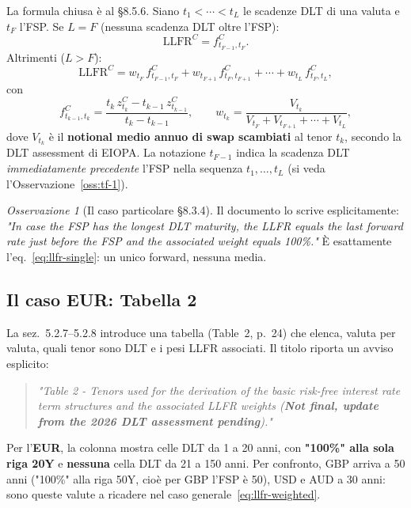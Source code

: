 \documentclass[11pt,a4paper]{article}
\theoremstyle{definition}
\theoremstyle{remark}
\newtheorem*{osservazione}{Osservazione}
\newcommand{\LLFR}{\mathrm{LLFR}}
\begin{document}
La formula chiusa \`e al §8.5.6. Siano $t_1<\cdots<t_L$ le scadenze DLT di una valuta e $t_F$
l'FSP. Se $L=F$ (nessuna scadenza DLT oltre l'FSP):
\begin{equation}
  \LLFR^C = f^C_{t_{F-1},t_F}.
  \label{eq:llfr-single}
\end{equation}
Altrimenti ($L>F$):
\begin{equation}
  \LLFR^C = w_{t_F}\,f^C_{t_{F-1},t_F} + w_{t_{F+1}}\,f^C_{t_F,t_{F+1}} + \cdots +
            w_{t_L}\,f^C_{t_F,t_L},
  \label{eq:llfr-weighted}
\end{equation}
con
\begin{equation}
  f^C_{t_{k-1},t_k} = \frac{t_k\,z^C_{t_k} - t_{k-1}\,z^C_{t_{k-1}}}{t_k-t_{k-1}},
  \qquad
  w_{t_k} = \frac{V_{t_k}}{V_{t_F}+V_{t_{F+1}}+\cdots+V_{t_L}},
  \label{eq:llfr-weights}
\end{equation}
dove $V_{t_k}$ \`e il \textbf{notional medio annuo di swap scambiati} al tenor $t_k$, secondo
la DLT assessment di EIOPA. La notazione $t_{F-1}$ indica la scadenza DLT \emph{immediatamente
precedente} l'FSP nella sequenza $t_1,\dots,t_L$ (si veda l'Osservazione~\ref{oss:tf-1}).

\begin{osservazione}[Il caso particolare §8.3.4]
\label{oss:caso-speciale}
Il documento lo scrive esplicitamente: \emph{"In case the FSP has the longest DLT maturity,
the LLFR equals the last forward rate just before the FSP and the associated weight equals
100\%."} È esattamente l'eq.~\eqref{eq:llfr-single}: un unico forward, nessuna media.
\end{osservazione}

\subsection{Il caso EUR: Tabella 2}
\label{sec:tabella2}

La sez.~5.2.7--5.2.8 introduce una tabella (Table~2, p.~24) che elenca, valuta per valuta,
quali tenor sono DLT e i pesi LLFR associati. Il titolo riporta un avviso esplicito:
\begin{quote}
\textit{"Table 2 - Tenors used for the derivation of the basic risk-free interest rate term
structures and the associated LLFR weights (\textbf{Not final, update from the 2026 DLT
assessment pending})."}
\end{quote}
Per l'\textbf{EUR}, la colonna mostra celle DLT da 1 a 20 anni, con \textbf{"100\%" alla sola
riga 20Y} e \textbf{nessuna} cella DLT da 21 a 150 anni. Per confronto, GBP arriva a 50 anni
("100\%" alla riga 50Y, cio\`e per GBP l'FSP \`e 50), USD e AUD a 30 anni: sono queste valute
a ricadere nel caso generale~\eqref{eq:llfr-weighted}.
\end{document}
